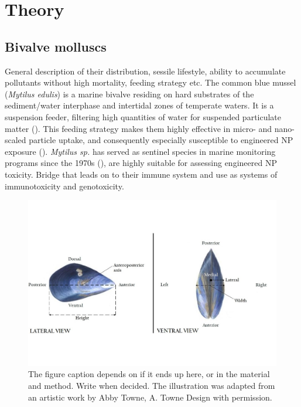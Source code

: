 \chapter{Theory}
\section{Bivalve molluscs}
General description of their distribution, sessile lifestyle, ability to accumulate pollutants without high mortality, feeding strategy etc. The common blue mussel (\emph{Mytilus edulis}) is a marine bivalve residing on hard substrates of the sediment/water interphase and intertidal zones of temperate waters. It is a suspension feeder, filtering high quantities of water for suspended particulate matter (\cite{Beyer2017b}). This feeding strategy makes them highly effective in micro- and nano-scaled particle uptake, and consequently especially susceptible to engineered NP exposure (\cite{Canesi2012}). \emph{Mytilus sp.} has served as sentinel species in marine monitoring programs since the 1970s (\cite{Goldberg1975}), are highly suitable for assessing engineered NP toxicity. Bridge that leads on to their immune system and use as systems of immunotoxicity and genotoxicity.

\begin{figure}[h]
    \centering
    \includegraphics[width=\textwidth]{figures/Anatomy/M_edulis_anatomical_axis_lateral.jpg}
    \caption{The figure caption depends on if it ends up here, or in the material and method. Write when decided. The illustration was adapted from an artistic work by Abby Towne, A. Towne Design with permission.}
    \label{fig:anatomical_axis}
\end{figure}


